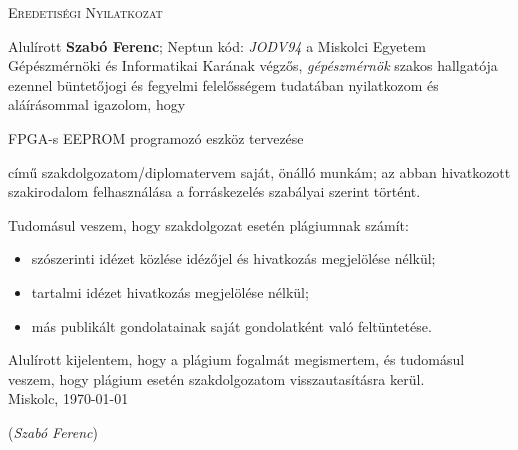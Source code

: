 \documentclass[a4paper,12pt,oneside]{book}
\newcommand{\nev}{Szabó Ferenc}
\newcommand{\neptun}{JODV94}
\newcommand{\cim}{FPGA-s EEPROM programozó eszköz tervezése}
\begin{document}
\thispagestyle{empty}
\begin{center}
	\textsc{\Large{Eredetiségi Nyilatkozat}}
\end{center}
{
Alulírott \textbf{\nev}; Neptun kód: \textit{\neptun} a Miskolci Egyetem Gépészmérnöki és Informatikai Karának végzős, \textit{gépészmérnök} szakos hallgatója ezennel büntetőjogi és fegyelmi felelősségem tudatában nyilatkozom és aláírásommal igazolom, hogy
\begin{center}
	\cim
\end{center}
című szakdolgozatom/diplomatervem saját, önálló munkám; az abban hivatkozott szakirodalom felhasználása a forráskezelés szabályai szerint történt.

Tudomásul veszem, hogy szakdolgozat esetén plágiumnak számít:
\begin{itemize}
	\item 	szószerinti idézet közlése idézőjel és hivatkozás megjelölése nélkül;
	\item	tartalmi idézet hivatkozás megjelölése nélkül;
	\item	más publikált gondolatainak saját gondolatként való feltüntetése.	 
\end{itemize}
Alulírott kijelentem, hogy a plágium fogalmát megismertem, és tudomásul veszem, hogy
plágium esetén szakdolgozatom visszautasításra kerül.\\
Miskolc, \today


{\raggedleft\vspace{1cm}(\textit{\nev})
	
}
}

\mainmatter

\clearpage
\tableofcontents
\listoffigures
\listoftables

\end{document}
